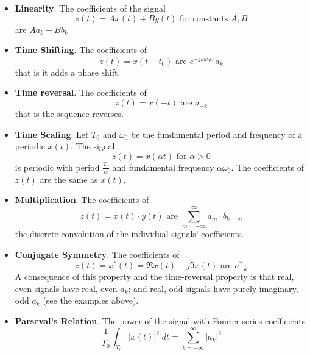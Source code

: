 \begin{itemize}
\item \textbf{Linearity}. The coefficients of the signal
  \[
  z(t) = Ax(t) + By(t) \mbox{ for constants } A,B 
  \]
  are $Aa_k + Bb_k$
\item \textbf{Time Shifting}. The coefficients of
  \[
  z(t) = x(t-t_0) \mbox{ are } e^{-jk\omega_0 t_0}a_k
  \]
  that is it adds a phase shift.
\item \textbf{Time reversal}. The coefficients of
  \[
  z(t) = x(-t) \mbox{ are } a_{-k}
  \]
  that is the sequence reverses.
\item \textbf{Time Scaling}. Let $T_0$ and $\omega_0$ be the fundamental period and frequency of a periodic $x(t)$. The signal 
  \[
  z(t) = x(\alpha t) \mbox{ for } \alpha > 0
  \]
  is periodic with period $\frac{T_0}{\alpha}$ and fundamental frequency $\alpha\omega_0$.
  The coefficients of $z(t)$ are the same as $x(t)$.
\item \textbf{Multiplication}. The coefficients of
  \[
  z(t) = x(t) \cdot y(t) \mbox{ are } \sum\limits_{m = -\infty}^{\infty} a_m\cdot b_{k-m}
  \]
  the discrete convolution of the individual signals' coefficients.
\item \textbf{Conjugate Symmetry}. The coefficients of
  \[
  z(t) = x^*(t) = \Re{x(t)} - j\Im{x(t)} \mbox{ are } a_{-k}^*
  \]
  A consequence of this property and the time-reversal property is that real, even signals have real, even $a_k$; and real, odd signals have purely imaginary, odd $a_k$ (see the examples above).
\item \textbf{Parseval's Relation}. The power of the signal with Fourier series coefficients
  \[
  \frac{1}{T_0} \int_{T_0} |x(t)|^2\;dt = \sum\limits_{k = -\infty}^{\infty} |a_k|^2
  \]
\end{itemize}
